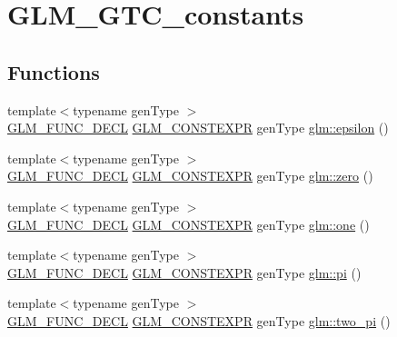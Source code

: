 \hypertarget{group__gtc__constants}{}\section{G\+L\+M\+\_\+\+G\+T\+C\+\_\+constants}
\label{group__gtc__constants}
\subsection*{Functions}
\begin{DoxyCompactItemize}
\item 
{\footnotesize template$<$typename gen\+Type $>$ }\\\mbox{\hyperlink{setup_8hpp_ab2d052de21a70539923e9bcbf6e83a51}{G\+L\+M\+\_\+\+F\+U\+N\+C\+\_\+\+D\+E\+CL}} \mbox{\hyperlink{setup_8hpp_a08b807947b47031d3a511f03f89645ad}{G\+L\+M\+\_\+\+C\+O\+N\+S\+T\+E\+X\+PR}} gen\+Type \mbox{\hyperlink{group__gtc__constants_ga2a1e57fc5592b69cfae84174cbfc9429}{glm\+::epsilon}} ()
\item 
{\footnotesize template$<$typename gen\+Type $>$ }\\\mbox{\hyperlink{setup_8hpp_ab2d052de21a70539923e9bcbf6e83a51}{G\+L\+M\+\_\+\+F\+U\+N\+C\+\_\+\+D\+E\+CL}} \mbox{\hyperlink{setup_8hpp_a08b807947b47031d3a511f03f89645ad}{G\+L\+M\+\_\+\+C\+O\+N\+S\+T\+E\+X\+PR}} gen\+Type \mbox{\hyperlink{group__gtc__constants_ga788f5a421fc0f40a1296ebc094cbaa8a}{glm\+::zero}} ()
\item 
{\footnotesize template$<$typename gen\+Type $>$ }\\\mbox{\hyperlink{setup_8hpp_ab2d052de21a70539923e9bcbf6e83a51}{G\+L\+M\+\_\+\+F\+U\+N\+C\+\_\+\+D\+E\+CL}} \mbox{\hyperlink{setup_8hpp_a08b807947b47031d3a511f03f89645ad}{G\+L\+M\+\_\+\+C\+O\+N\+S\+T\+E\+X\+PR}} gen\+Type \mbox{\hyperlink{group__gtc__constants_ga39c2fb227631ca25894326529bdd1ee5}{glm\+::one}} ()
\item 
{\footnotesize template$<$typename gen\+Type $>$ }\\\mbox{\hyperlink{setup_8hpp_ab2d052de21a70539923e9bcbf6e83a51}{G\+L\+M\+\_\+\+F\+U\+N\+C\+\_\+\+D\+E\+CL}} \mbox{\hyperlink{setup_8hpp_a08b807947b47031d3a511f03f89645ad}{G\+L\+M\+\_\+\+C\+O\+N\+S\+T\+E\+X\+PR}} gen\+Type \mbox{\hyperlink{group__gtc__constants_ga94bafeb2a0f23ab6450fed1f98ee4e45}{glm\+::pi}} ()
\item 
{\footnotesize template$<$typename gen\+Type $>$ }\\\mbox{\hyperlink{setup_8hpp_ab2d052de21a70539923e9bcbf6e83a51}{G\+L\+M\+\_\+\+F\+U\+N\+C\+\_\+\+D\+E\+CL}} \mbox{\hyperlink{setup_8hpp_a08b807947b47031d3a511f03f89645ad}{G\+L\+M\+\_\+\+C\+O\+N\+S\+T\+E\+X\+PR}} gen\+Type \mbox{\hyperlink{group__gtc__constants_gaa5276a4617566abcfe49286f40e3a256}{glm\+::two\+\_\+pi}} ()

\end{DoxyCompactItemize}
